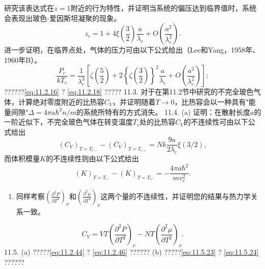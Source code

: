 研究该表达式在\(z=1\)附近的行为特性，并证明当系统的偏压达到临界值时，系统会表现出玻色-爱因斯坦凝聚的现象。
\begin{equation}\tag{11.6.85}\label{eq:11.6.85}
z _ { c } = 1 + 4 \xi \left( \frac { 3 } { 2 } \right) \frac { a } { \lambda _ { c } } + O \left( \frac { a ^{2} } { \lambda _ { c } ^{2} } \right) .
\end{equation}
进一步证明，在临界点处，气体的压力可由以下公式给出（Lee和Yang，1958年、1960年B）。
\begin{equation}\tag{11.6.86}\label{eq:11.6.86}
\frac { P _ { c } } { k T _ { c } } = \frac { 1 } { \lambda _ { c } ^{3} } \left[ \zeta \left( \frac { 5 } { 2 } \right) + 2 \left\{ \zeta \left( \frac { 3 } { 2 } \right) \right\} ^{2} \frac { a } { \lambda _ { c } } + O \left( \frac { a ^{2} } { \lambda _ { c } ^{2} } \right) \right] ;
\end{equation}
??????\autoref{eq:11.2.16} ? \autoref{eq:11.2.18} ?????
11.3. 对于在第11.2节中研究的不完全玻色气体，计算绝对零度附近的比热容\(C_V\)，并证明随着\(T \to 0\)，比热容会以一种具有"能量间隙"\(\Delta = 4\pi a\hbar^2 n/m\)的系统所特有的方式消失。
11.4. (a) 证明：在散射长度\(a\)的一阶近似下，不完全玻色气体在转变温度\(T_c\)处的比热容\(C_V\)的不连续性可由以下公式给出
\begin{equation}\tag{11.6.87}\label{eq:11.6.87}
( C _ { V } ) _ { T = T _ { c - } } - ( C _ { V } ) _ { T = T _ { c + } } = N k \frac { 9 a } { 2 \lambda _ { c } } \xi ( 3 / 2 ) ,
\end{equation}
而体积模量\(K\)的不连续性则由以下公式给出
\begin{equation}\tag{11.6.88}\label{eq:11.6.88}
( K ) _ { T = T _ { c ^{-} } } - ( K ) _ { T = T _ { c ^{+} } } = - \frac { 4 \pi a \hbar ^{2} } { m v _ { c } ^{2} } .
\end{equation}
\begin{enumerate}
\def\labelenumi{(\alph{enumi})}
\setcounter{enumi}{1}
\item
  同样考察\(\left(\frac{\partial^2 P}{\partial T^2}\right)_\nu\)和\(\left(\frac{\partial^2 \mu}{\partial T^2}\right)_\nu\)这两个量的不连续性，并证明您的结果与热力学关系一致。
\end{enumerate}
\begin{equation}\tag{11.6.89}\label{eq:11.6.89}
C _ { V } = V T \left( \frac { \partial ^{2} P } { \partial T ^{2} } \right) _ { \nu } - N T \left( \frac { \partial ^{2} \mu } { \partial T ^{2} } \right) _ { \nu } .
\end{equation}
11.5. (a) ?????\autoref{eq:11.2.44} ? \autoref{eq:11.2.46} ?????? (b) ?????\autoref{eq:11.5.23} ? \autoref{eq:11.5.24} ??????
